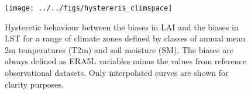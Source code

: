 \documentclass[gmd, manuscript]{copernicus}
\begin{document}
\begin{figure}[h]
\begin{center}
\texttt{[image: ../../figs/hystereris\_climspace]}
\caption{{Hysteretic behaviour between the biases in LAI and the biases in LST for
a range of climate zones defined by classes of annual mean 2m
temperatures (T2m) and soil moisture (SM). The biases are always defined
as ERA5L variables minus the values from reference observational
datasets. Only interpolated curves are shown for clarity purposes.
{\label{925458}}%
}}
\end{center}
\end{figure}
\end{document}
